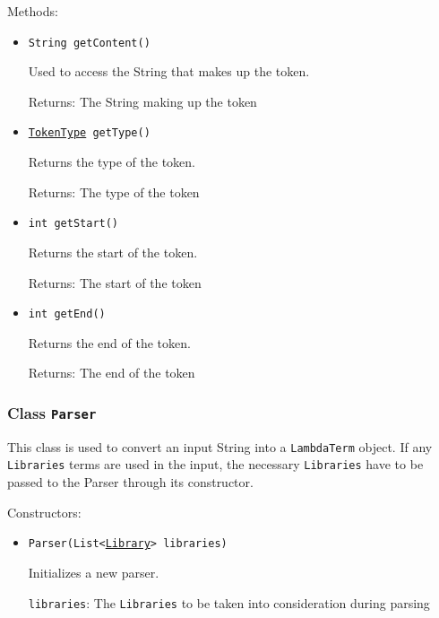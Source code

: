 Methods:
\begin{itemize}
\item \texttt{String getContent()}

Used to access the String that makes up the token.

Returns: The String making up the token

\item \texttt{\hyperref[type:edu.kit.wavelength.client.model.term.parsing.TokenType]{TokenType} getType()}

Returns the type of the token.

Returns: The type of the token

\item \texttt{int getStart()}

Returns the start of the token.

Returns: The start of the token

\item \texttt{int getEnd()}

Returns the end of the token.

Returns: The end of the token

\end{itemize}

\subsubsection{Class \texttt{Parser}}
\label{type:edu.kit.wavelength.client.model.term.parsing.Parser}
This class is used to convert an input String into a \texttt{LambdaTerm}
 object. If any \texttt{Libraries} terms are used in the input, the necessary
 \texttt{Libraries} have to be passed to the Parser through its constructor.

Constructors:
\begin{itemize}
\item \texttt{Parser(List<\hyperref[type:edu.kit.wavelength.client.model.library.Library]{Library}> libraries)}

Initializes a new parser.

\texttt{libraries}: The \texttt{Libraries} to be taken into consideration during
            parsing

\end{itemize}

